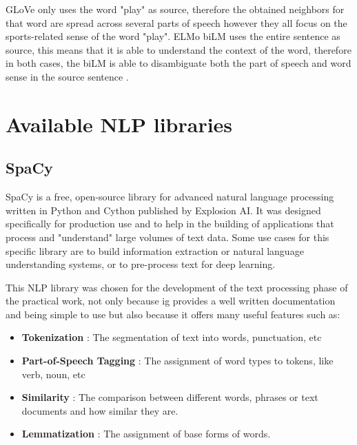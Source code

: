         \par GLoVe only uses the word "play" as source, therefore the obtained neighbors for that word are spread across several parts of speech however they all focus on the sports-related sense of the word "play". ELMo biLM uses the entire sentence as source, this means that it is able to understand the context of the word, therefore in both cases, the biLM is able to disambiguate both the part of speech and word sense in the source sentence \cite{Peters:2018}.
        

       
\section{Available NLP libraries}
    \label{sec:libraries}

        \subsection{SpaCy}
        
        \par SpaCy is a free, open-source library for advanced natural language processing written in Python and Cython published by Explosion AI. It was designed specifically for production use and to help in the building of applications that process and "understand" large volumes of text data.  Some use cases for this specific library are to build information extraction or natural language understanding systems, or to pre-process text for deep learning. \cite{Spacy2017}

        \par This NLP library was chosen for the development of the text processing phase of the practical work, not only because ig provides a well written documentation and being simple to use but also because it offers many useful features such as:

        \begin{itemize}
            \item \textbf{Tokenization} : The segmentation of text into words, punctuation, etc
            \item \textbf{Part-of-Speech Tagging} : The assignment of word types to tokens, like verb, noun, etc
            \item \textbf{Similarity} : The comparison between different words, phrases or text documents and how similar they are.
            \item \textbf{Lemmatization} : The assignment of base forms of words.
        \end{itemize}

